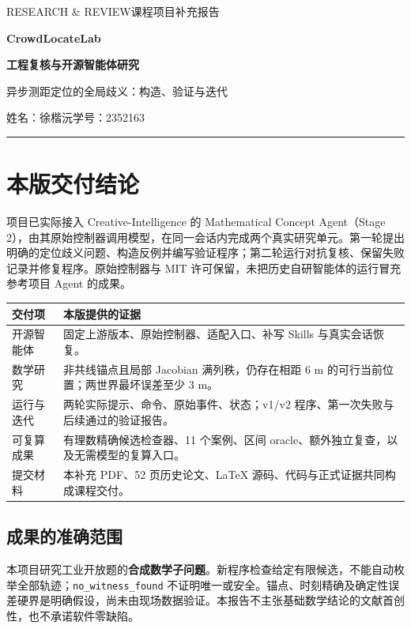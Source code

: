 \documentclass[UTF8,a4paper,zihao=-4,fontset=none]{ctexart}
\newcommand{\code}[1]{{\small\nolinkurl{#1}}}
\begin{document}
\thispagestyle{empty}
{\sffamily\large\color{teal}RESEARCH \& REVIEW\hfill 课程项目补充报告\par}
\vspace{5mm}
{\Huge\bfseries\color{navy}CrowdLocateLab\par}
\vspace{4mm}
{\LARGE\bfseries 工程复核与开源智能体研究\par}
\vspace{4mm}
{\large\color{muted}异步测距定位的全局歧义：构造、验证与迭代\par}
\vspace{2mm}
{\normalsize 姓名：徐楷沅\quad 学号：2352163\par}
\vspace{3mm}\noindent\textcolor{teal}{\rule{\textwidth}{1pt}}

\begingroup\small\setlength{\parskip}{3pt}\linespread{1.04}\selectfont
\section*{本版交付结论}
项目已实际接入 Creative-Intelligence 的 Mathematical Concept Agent（Stage 2），由其原始控制器调用模型，在同一会话内完成两个真实研究单元。第一轮提出明确的定位歧义问题、构造反例并编写验证程序；第二轮运行对抗复核、保留失败记录并修复程序。原始控制器与 MIT 许可保留，未把历史自研智能体的运行冒充参考项目 Agent 的成果。

\noindent\begin{tabularx}{\textwidth}{@{}p{28mm}Y@{}}
\toprule
交付项 & 本版提供的证据 \\
\midrule
开源智能体 & 固定上游版本、原始控制器、适配入口、补写 Skills 与真实会话恢复。\\[4pt]
数学研究 & 非共线锚点且局部 Jacobian 满列秩，仍存在相距 6 m 的可行当前位置；两世界最坏误差至少 3 m。\\[4pt]
运行与迭代 & 两轮实际提示、命令、原始事件、状态；v1/v2 程序、第一次失败与后续通过的验证报告。\\[4pt]
可复算成果 & 有理数精确候选检查器、11 个案例、区间 oracle、额外独立复查，以及无需模型的复算入口。\\[4pt]
提交材料 & 本补充 PDF、52 页历史论文、LaTeX 源码、代码与正式证据共同构成课程交付。\\
\bottomrule
\end{tabularx}

\subsection*{成果的准确范围}
本项目研究工业开放题的\textbf{合成数学子问题}。新程序检查给定有限候选，不能自动枚举全部轨迹；\code{no_witness_found} 不证明唯一或安全。锚点、时刻精确及确定性误差硬界是明确假设，尚未由现场数据验证。本报告不主张基础数学结论的文献首创性，也不承诺软件零缺陷。
\end{document}
